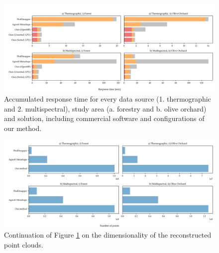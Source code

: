 \begin{figure}[ht]
    \centering
    \includegraphics[width=\linewidth]{figs/multi_thermal_projection/results/stacked_global_time.png}
    \caption{Accumulated response time for every data source (1. thermographic and 2. multispectral), study area (a. forestry and b. olive orchard) and solution, including commercial software and configurations of our method. }
    \label{fig:occlusion_results_global_time}
\end{figure}

\begin{figure}
    \ContinuedFloat
    \centering
    \includegraphics[width=\linewidth]{figs/multi_thermal_projection/results/point_cloud_size.png}
    \caption{Continuation of Figure \ref{fig:occlusion_results_global_time} on the dimensionality of the reconstructed point clouds. }
    \label{fig:occlusion_point_cloud_size}
\end{figure}

\newcommand\numExperiments{4}

